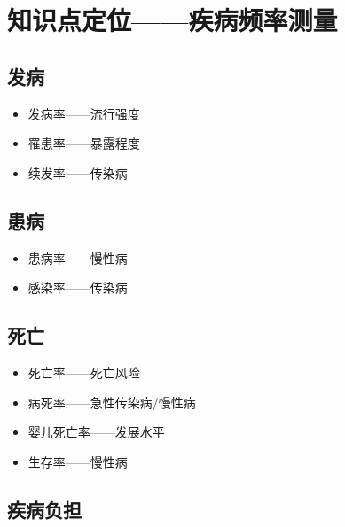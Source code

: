 \documentclass[
]{book}
\providecommand{\tightlist}{%
  \setlength{\itemsep}{0pt}\setlength{\parskip}{0pt}}
\theoremstyle{definition}
\theoremstyle{definition}
\theoremstyle{definition}
\theoremstyle{definition}
\theoremstyle{remark}
\begin{document}
\hypertarget{ux77e5ux8bc6ux70b9ux5b9aux4f4dux75beux75c5ux9891ux7387ux6d4bux91cf}{%
\section{知识点定位------疾病频率测量}\label{ux77e5ux8bc6ux70b9ux5b9aux4f4dux75beux75c5ux9891ux7387ux6d4bux91cf}}

\hypertarget{ux53d1ux75c5}{%
\subsection{发病}\label{ux53d1ux75c5}}

\begin{itemize}
\tightlist
\item
  发病率------流行强度
\item
  罹患率------暴露程度
\item
  续发率------传染病
\end{itemize}

\hypertarget{ux60a3ux75c5}{%
\subsection{患病}\label{ux60a3ux75c5}}

\begin{itemize}
\tightlist
\item
  患病率------慢性病
\item
  感染率------传染病
\end{itemize}

\hypertarget{ux6b7bux4ea1}{%
\subsection{死亡}\label{ux6b7bux4ea1}}

\begin{itemize}
\tightlist
\item
  死亡率------死亡风险
\item
  病死率------急性传染病/慢性病
\item
  婴儿死亡率------发展水平
\item
  生存率------慢性病
\end{itemize}

\hypertarget{ux75beux75c5ux8d1fux62c5}{%
\subsection{疾病负担}\label{ux75beux75c5ux8d1fux62c5}}
\end{document}
